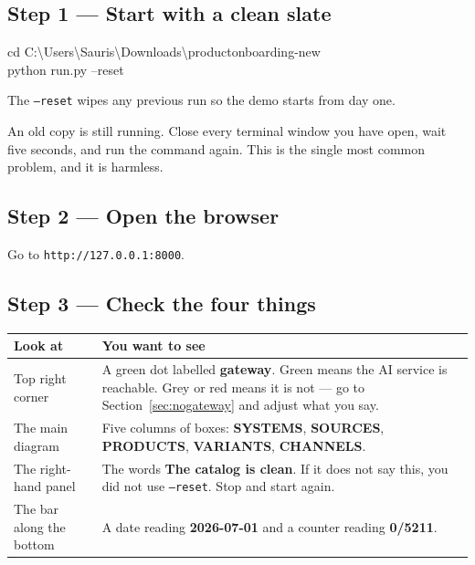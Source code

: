 \documentclass[11pt,a4paper]{article}
\newcommand{\ui}[1]{\textbf{#1}}          %
\begin{document}
\subsection{Step 1 --- Start with a clean slate}

\begin{cmd}
cd C:\textbackslash Users\textbackslash Sauris\textbackslash Downloads\textbackslash productonboarding-new\\
python run.py --reset
\end{cmd}

The \texttt{--reset} wipes any previous run so the demo starts from day one.

\begin{careful}
An old copy is still running. Close every terminal window you have open, wait
five seconds, and run the command again. This is the single most common
problem, and it is harmless.
\end{careful}

\subsection{Step 2 --- Open the browser}

Go to \texttt{http://127.0.0.1:8000}.

\subsection{Step 3 --- Check the four things}

\begin{longtable}{@{}p{4.6cm}p{10.4cm}@{}}
\toprule
\textbf{Look at} & \textbf{You want to see} \\
\midrule
\endhead
Top right corner & A green dot labelled \ui{gateway}. Green means the AI
service is reachable. Grey or red means it is not --- go to
Section~\ref{sec:nogateway} and adjust what you say. \\[4pt]
The main diagram & Five columns of boxes: \ui{SYSTEMS}, \ui{SOURCES},
\ui{PRODUCTS}, \ui{VARIANTS}, \ui{CHANNELS}. \\[4pt]
The right-hand panel & The words \ui{The catalog is clean}. If it does not say
this, you did not use \texttt{--reset}. Stop and start again. \\[4pt]
The bar along the bottom & A date reading \ui{2026-07-01} and a counter
reading \ui{0/5211}. \\
\bottomrule
\end{longtable}
\end{document}
